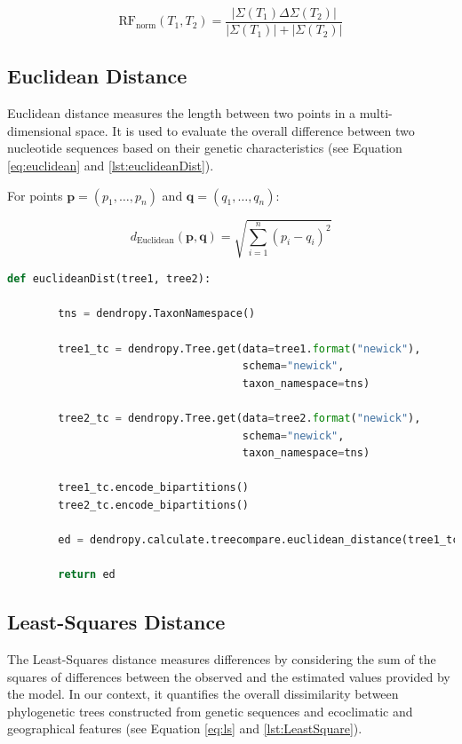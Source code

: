 \begin{equation}\label{eq:rf_norm}
    \text{RF}_{\text{norm}}(T_1, T_2) = \frac{| \Sigma(T_1) \Delta \Sigma(T_2) |}{| \Sigma(T_1) | + | \Sigma(T_2) |}
\end{equation}

\subsection{Euclidean Distance}\label{euclidean}
Euclidean distance measures the length between two points in a multi-dimensional space. It is used to evaluate the overall difference between two nucleotide sequences based on their genetic characteristics (see Equation \eqref{eq:euclidean} and \autoref{lst:euclideanDist}).

For points $\mathbf{p} = (p_1, \ldots, p_n)$ and $\mathbf{q} = (q_1, \ldots, q_n)$:

\begin{equation}\label{eq:euclidean}
    d_{\text{Euclidean}}(\mathbf{p}, \mathbf{q}) = \sqrt{\sum_{i=1}^{n} (p_i - q_i)^2}
\end{equation}

\begin{lstlisting}[label=lst:euclideanDist,language=Python,caption=Python script for calculating the Euclidean distance using the ete3 package in the aPhyloGeo package]
    def euclideanDist(tree1, tree2):
        
        tns = dendropy.TaxonNamespace()
        
        tree1_tc = dendropy.Tree.get(data=tree1.format("newick"), 
                                     schema="newick", 
                                     taxon_namespace=tns)
                                     
        tree2_tc = dendropy.Tree.get(data=tree2.format("newick"), 
                                     schema="newick", 
                                     taxon_namespace=tns)
                                     
        tree1_tc.encode_bipartitions()
        tree2_tc.encode_bipartitions()

        ed = dendropy.calculate.treecompare.euclidean_distance(tree1_tc, tree2_tc)

        return ed
\end{lstlisting}

\subsection{Least-Squares Distance}\label{LS}
The Least-Squares distance measures differences by considering the sum of the squares of differences between the observed and the estimated values provided by the model. In our context, it quantifies the overall dissimilarity between phylogenetic trees constructed from genetic sequences and ecoclimatic and geographical features (see Equation \eqref{eq:ls} and \autoref{lst:LeastSquare}).

